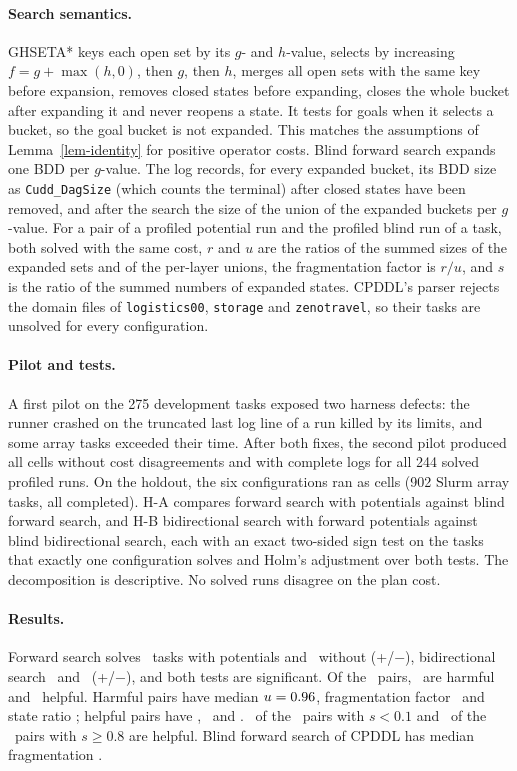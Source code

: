 \documentclass[letterpaper]{article}
\newcommand{\num}[1]{\numprint{#1}}
\theoremstyle{plain}
\theoremstyle{definition}
\theoremstyle{remark}
\begin{document}
\paragraph{Search semantics.}
GHSETA* keys each open set by its $g$- and $h$-value, selects by increasing
$f=g+\max(h,0)$, then $g$, then $h$, merges all open sets with the same key
before expansion, removes closed states before expanding, closes the whole
bucket after expanding it and never reopens a state.  It tests for goals when
it selects a bucket, so the goal bucket is not expanded.  This matches the
assumptions of Lemma~\ref{lem-identity} for positive operator costs.  Blind
forward search expands one BDD per $g$-value.  The log records, for every
expanded bucket, its BDD size as \texttt{Cudd\_DagSize} (which counts the
terminal) after closed states have been removed, and after the search the
size of the union of the expanded buckets per $g$-value.  For a pair of a
profiled potential run and the profiled blind run of a task, both solved
with the same cost, $r$ and $u$ are the ratios of the summed sizes of the
expanded sets and of the per-layer unions, the fragmentation factor is
$r/u$, and $s$ is the ratio of the summed numbers of expanded states.
CPDDL's parser rejects the domain files of \texttt{logistics00},
\texttt{storage} and \texttt{zenotravel}, so their tasks are unsolved for
every configuration.

\paragraph{Pilot and tests.}
A first pilot on the 275 development tasks exposed two harness defects: the
runner crashed on the truncated last log line of a run killed by its limits,
and some array tasks exceeded their time.  After both fixes, the second
pilot produced all \num{1650} cells without cost disagreements and with
complete logs for all 244 solved profiled runs.  On the holdout, the six
configurations ran as \num{6312} cells (902 Slurm array tasks, all
completed).  H-A compares forward search with potentials against blind
forward search, and H-B bidirectional search with forward potentials against
blind bidirectional search, each with an exact two-sided sign test on the
tasks that exactly one configuration solves and Holm's adjustment over both
tests.  The decomposition is descriptive.  No solved runs disagree on the
plan cost.

\paragraph{Results.}
Forward search solves \CpSolvedPotFw\ tasks with potentials and
\CpSolvedBlindFw\ without (+\CpFwGains/$-$\CpFwLosses), bidirectional search
\CpSolvedPotBi\ and \CpSolvedBlindBi\ (+\CpBiGains/$-$\CpBiLosses), and both
tests are significant.  Of the \CpPairs\ pairs, \CpHarmful\ are harmful and
\CpHelpful\ helpful.  Harmful pairs have median $u=0.96$,
fragmentation factor \CpHurtFrag\ and state ratio \CpHurtStates; helpful
pairs have \CpHelpUnion, \CpHelpFrag\ and \CpHelpStates.  \CpLowHelpful\ of
the \CpLowPairs\ pairs with $s<0.1$ and \CpHighHelpful\ of the \CpHighPairs\
pairs with $s\geq0.8$ are helpful.  Blind forward search of CPDDL has median
fragmentation \CpBlindFrag.
\end{document}
